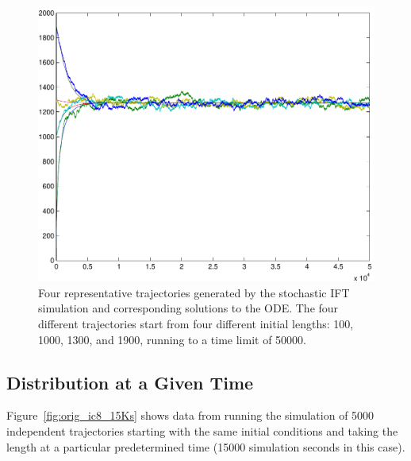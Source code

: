 \documentclass[titlepage]{article}
\begin{document}
\begin{figure}[!h]
\centering
\includegraphics[width=\textwidth]{OriginalModelTrajs}
\caption{
Four representative trajectories generated by the stochastic IFT simulation and corresponding solutions to the ODE.
The four different trajectories start from four different initial lengths: 100, 1000, 1300, and 1900, running to a time limit of 50000.
}
\label{fig:originalTrajs}
\end{figure}

\subsection{Distribution at a Given Time}
Figure~\ref{fig:orig_ic8_15Ks} shows data from running the simulation of 5000 independent trajectories starting with the same initial conditions and taking the length at a particular predetermined time (15000 simulation seconds in this case).

\end{document}
